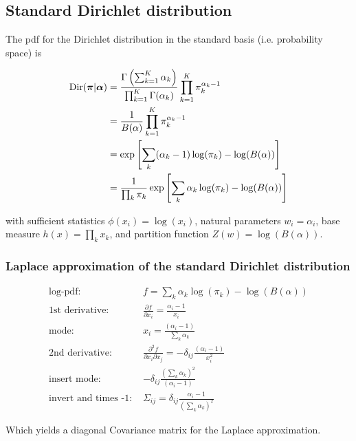\subsection{Standard Dirichlet distribution}

The pdf for the Dirichlet distribution in the standard basis (i.e. probability space) is

\begin{subequations}
\begin{align}
\mathrm{Dir}(\boldsymbol{\pi} | {\boldsymbol{\alpha}}) &= \frac{\Gamma \left( \sum_{k=1}^K \alpha_k \right)}{\prod_{k=1}^K \Gamma(\alpha_k)} \prod_{k=1}^K \pi_k^{\alpha_k-1} \\
&= \frac{1}{B(\alpha)} \prod_{k=1}^K \pi_k^{\alpha_k-1} \\
&= \exp\left[\sum_k(\alpha_k-1)\log(\pi_k) - \log(B(\alpha))\right] \\
&= \frac{1}{\prod_k \pi_k} \exp\left[\sum_k\alpha_k\log(\pi_k) - \log(B(\alpha))\right] \\
\end{align}
\end{subequations}

with sufficient statistics $\phi(x_i) = \log(x_i)$, natural parameters $w_i=\alpha_i$, base measure $h(x) = \prod_k x_k$, and partition function $Z(w) = \log(B(\alpha))$.

\subsubsection{Laplace approximation of the standard Dirichlet distribution}

\begin{align*}
\text{log-pdf: } & f = \sum_k\alpha_k\log(\pi_k) - \log(B(\alpha)) \\
\text{1st derivative: }&  \frac{\partial f}{\partial x_i} =  \frac{\alpha_i-1}{x_i}\\
\text{mode: }& x_i = \frac{(\alpha_i - 1)}{\sum_k \alpha_k} \\
\text{2nd derivative: }&  \frac{\partial^2 f}{\partial x_i \partial x_j} = - \delta_{ij} \frac{(\alpha_i - 1)}{x_i^2} \\
\text{insert mode: }& - \delta_{ij}\frac{(\sum_k \alpha_k)^2}{(\alpha_i - 1)} \\
\text{invert and times -1: }&\Sigma_{ij} = \delta_{ij} \frac{\alpha_i - 1}{(\sum_k \alpha_k)^2}
\end{align*}

Which yields a diagonal Covariance matrix for the Laplace approximation.

